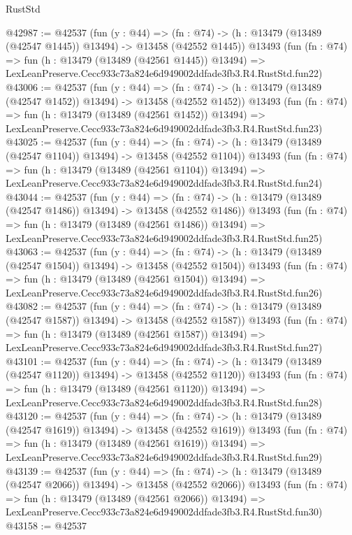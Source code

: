 \begin{lexlean}{RustStd}
\begin{coremodule}
@42987 := @42537
    (fun (y : @44) =>
    (fn : @74) -> (h : @13479 (@13489 (@42547 @1445)) @13494) -> @13458 (@42552 @1445))
    @13493
    (fun (fn : @74) =>
    fun (h : @13479 (@13489 (@42561 @1445)) @13494) =>
    LexLeanPreserve.Cecc933c73a824e6d949002ddfade3fb3.R4.RustStd.fun22)
@43006 := @42537
    (fun (y : @44) =>
    (fn : @74) -> (h : @13479 (@13489 (@42547 @1452)) @13494) -> @13458 (@42552 @1452))
    @13493
    (fun (fn : @74) =>
    fun (h : @13479 (@13489 (@42561 @1452)) @13494) =>
    LexLeanPreserve.Cecc933c73a824e6d949002ddfade3fb3.R4.RustStd.fun23)
@43025 := @42537
    (fun (y : @44) =>
    (fn : @74) -> (h : @13479 (@13489 (@42547 @1104)) @13494) -> @13458 (@42552 @1104))
    @13493
    (fun (fn : @74) =>
    fun (h : @13479 (@13489 (@42561 @1104)) @13494) =>
    LexLeanPreserve.Cecc933c73a824e6d949002ddfade3fb3.R4.RustStd.fun24)
@43044 := @42537
    (fun (y : @44) =>
    (fn : @74) -> (h : @13479 (@13489 (@42547 @1486)) @13494) -> @13458 (@42552 @1486))
    @13493
    (fun (fn : @74) =>
    fun (h : @13479 (@13489 (@42561 @1486)) @13494) =>
    LexLeanPreserve.Cecc933c73a824e6d949002ddfade3fb3.R4.RustStd.fun25)
@43063 := @42537
    (fun (y : @44) =>
    (fn : @74) -> (h : @13479 (@13489 (@42547 @1504)) @13494) -> @13458 (@42552 @1504))
    @13493
    (fun (fn : @74) =>
    fun (h : @13479 (@13489 (@42561 @1504)) @13494) =>
    LexLeanPreserve.Cecc933c73a824e6d949002ddfade3fb3.R4.RustStd.fun26)
@43082 := @42537
    (fun (y : @44) =>
    (fn : @74) -> (h : @13479 (@13489 (@42547 @1587)) @13494) -> @13458 (@42552 @1587))
    @13493
    (fun (fn : @74) =>
    fun (h : @13479 (@13489 (@42561 @1587)) @13494) =>
    LexLeanPreserve.Cecc933c73a824e6d949002ddfade3fb3.R4.RustStd.fun27)
@43101 := @42537
    (fun (y : @44) =>
    (fn : @74) -> (h : @13479 (@13489 (@42547 @1120)) @13494) -> @13458 (@42552 @1120))
    @13493
    (fun (fn : @74) =>
    fun (h : @13479 (@13489 (@42561 @1120)) @13494) =>
    LexLeanPreserve.Cecc933c73a824e6d949002ddfade3fb3.R4.RustStd.fun28)
@43120 := @42537
    (fun (y : @44) =>
    (fn : @74) -> (h : @13479 (@13489 (@42547 @1619)) @13494) -> @13458 (@42552 @1619))
    @13493
    (fun (fn : @74) =>
    fun (h : @13479 (@13489 (@42561 @1619)) @13494) =>
    LexLeanPreserve.Cecc933c73a824e6d949002ddfade3fb3.R4.RustStd.fun29)
@43139 := @42537
    (fun (y : @44) =>
    (fn : @74) -> (h : @13479 (@13489 (@42547 @2066)) @13494) -> @13458 (@42552 @2066))
    @13493
    (fun (fn : @74) =>
    fun (h : @13479 (@13489 (@42561 @2066)) @13494) =>
    LexLeanPreserve.Cecc933c73a824e6d949002ddfade3fb3.R4.RustStd.fun30)
@43158 := @42537

\end{coremodule}
\end{lexlean}
